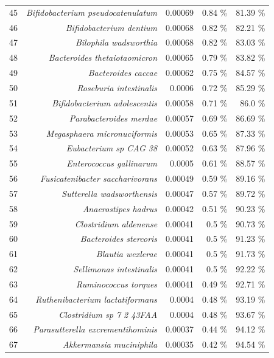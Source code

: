 \documentclass{article}
\begin{document}
\begin{table}
\begin{centering}
\begin{tabular}{|r|r|r|r|r|}
  45 & \textit{Bifidobacterium pseudocatenulatum} & 0.00069 & 0.84 \% & 81.39 \% \\
  46 & \textit{Bifidobacterium dentium} & 0.00068 & 0.82 \% & 82.21 \% \\
  47 & \textit{Bilophila wadsworthia} & 0.00068 & 0.82 \% & 83.03 \% \\
  48 & \textit{Bacteroides thetaiotaomicron} & 0.00065 & 0.79 \% & 83.82 \% \\
  49 & \textit{Bacteroides caccae} & 0.00062 & 0.75 \% & 84.57 \% \\
  50 & \textit{Roseburia intestinalis} & 0.0006 & 0.72 \% & 85.29 \% \\
  51 & \textit{Bifidobacterium adolescentis} & 0.00058 & 0.71 \% & 86.0 \% \\
  52 & \textit{Parabacteroides merdae} & 0.00057 & 0.69 \% & 86.69 \% \\
  53 & \textit{Megasphaera micronuciformis} & 0.00053 & 0.65 \% & 87.33 \% \\
  54 & \textit{Eubacterium sp CAG 38} & 0.00052 & 0.63 \% & 87.96 \% \\
  55 & \textit{Enterococcus gallinarum} & 0.0005 & 0.61 \% & 88.57 \% \\
  56 & \textit{Fusicatenibacter saccharivorans} & 0.00049 & 0.59 \% & 89.16 \% \\
  57 & \textit{Sutterella wadsworthensis} & 0.00047 & 0.57 \% & 89.72 \% \\
  58 & \textit{Anaerostipes hadrus} & 0.00042 & 0.51 \% & 90.23 \% \\
  59 & \textit{Clostridium aldenense} & 0.00041 & 0.5 \% & 90.73 \% \\
  60 & \textit{Bacteroides stercoris} & 0.00041 & 0.5 \% & 91.23 \% \\
  61 & \textit{Blautia wexlerae} & 0.00041 & 0.5 \% & 91.73 \% \\
  62 & \textit{Sellimonas intestinalis} & 0.00041 & 0.5 \% & 92.22 \% \\
  63 & \textit{Ruminococcus torques} & 0.00041 & 0.49 \% & 92.71 \% \\
  64 & \textit{Ruthenibacterium lactatiformans} & 0.0004 & 0.48 \% & 93.19 \% \\
  65 & \textit{Clostridium sp 7 2 43FAA} & 0.0004 & 0.48 \% & 93.67 \% \\
  66 & \textit{Parasutterella excrementihominis} & 0.00037 & 0.44 \% & 94.12 \% \\
  67 & \textit{Akkermansia muciniphila} & 0.00035 & 0.42 \% & 94.54 \% \\

\end{tabular}
\end{centering}
\end{table}
\end{document}
